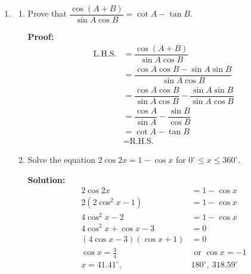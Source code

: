 \documentclass{report}
\newcommand{\sol}{\textbf{Solution:}}
\newcommand{\proof}{\textbf{Proof:}}
\begin{document}
\begin{enumerate}[leftmargin=*]
          \newpage
    \item \begin{enumerate}
              \item Prove that $\dfrac{\cos (A+B)}{\sin A \cos B}=\cot A-\tan B$.

                    \proof{}
                    \begin{align*}
                        \text{L.H.S.} & = \dfrac{\cos (A+B)}{\sin A \cos B}                                           \\
                                      & = \dfrac{\cos A \cos B - \sin A \sin B}{\sin A \cos B}                        \\
                                      & = \dfrac{\cos A \cos B}{\sin A \cos B} - \dfrac{\sin A \sin B}{\sin A \cos B} \\
                                      & = \dfrac{\cos A}{\sin A} - \dfrac{\sin B}{\cos B}                             \\
                                      & = \cot A - \tan B                                                             \\
                                      & = \text{R.H.S.}
                    \end{align*}

              \item Solve the equation $2\cos{2x} = 1 - \cos x$ for $0^{\circ} \leq x \leq
                        360^{\circ}$.

                    \sol{}
                    \begin{align*}
                        2\cos{2x}                           & = 1 - \cos x                 \\
                        2(2\cos^2 x-1)                      & = 1 - \cos x                 \\
                        4\cos^2 x-2                         & = 1 - \cos x                 \\
                        4\cos^2 x+\cos x-3                  & = 0                          \\
                        (4\cos x-3)(\cos x+1)               & = 0                          \\
                        \cos x                = \frac{3}{4} & \text{ or } \cos x = -1      \\
                        x = 41.41^{\circ},\                 & 180^{\circ},\ 318.59^{\circ}
                    \end{align*}


\end{enumerate}
\end{enumerate}
\end{document}
